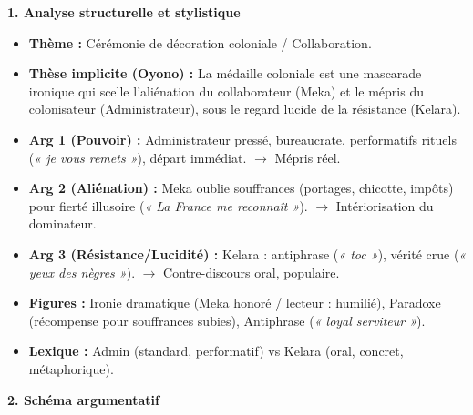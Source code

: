 \documentclass[11pt]{article}
\begin{document}
\begin{corrige}
\textbf{1. Analyse structurelle et stylistique}
\begin{itemize}
    \item \textbf{Thème :} Cérémonie de décoration coloniale / Collaboration.
    \item \textbf{Thèse implicite (Oyono) :} La médaille coloniale est une mascarade ironique qui scelle l'aliénation du collaborateur (Meka) et le mépris du colonisateur (Administrateur), sous le regard lucide de la résistance (Kelara).
    \item \textbf{Arg 1 (Pouvoir) :} Administrateur pressé, bureaucrate, performatifs rituels (\emph{« je vous remets »}), départ immédiat. $\rightarrow$ Mépris réel.
    \item \textbf{Arg 2 (Aliénation) :} Meka oublie souffrances (portages, chicotte, impôts) pour fierté illusoire (\emph{« La France me reconnaît »}). $\rightarrow$ Intériorisation du dominateur.
    \item \textbf{Arg 3 (Résistance/Lucidité) :} Kelara : antiphrase (\emph{« toc »}), vérité crue (\emph{« yeux des nègres »}). $\rightarrow$ Contre-discours oral, populaire.
    \item \textbf{Figures :} Ironie dramatique (Meka honoré / lecteur : humilié), Paradoxe (récompense pour souffrances subies), Antiphrase (\emph{« loyal serviteur »}).
    \item \textbf{Lexique :} Admin (standard, performatif) vs Kelara (oral, concret, métaphorique).
\end{itemize}

\textbf{2. Schéma argumentatif}
\begin{center}
\end{center}


\end{corrige}
\end{document}
